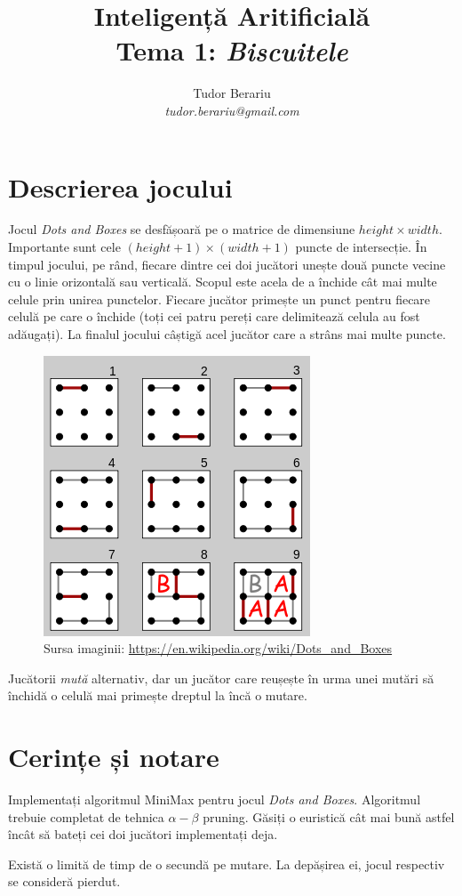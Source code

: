 \documentclass[12pt]{article}
\title{Inteligență Aritificială \\ Tema 1: \emph{Biscuitele}}
\author{Tudor Berariu \\ \emph{tudor.berariu@gmail.com}}
\begin{document}
\maketitle

\section{Descrierea jocului}
\label{sec:desc}

Jocul \emph{Dots and Boxes} se desfășoară pe o matrice de dimensiune
$height \times width$. Importante sunt cele $(height+1) \times
(width+1)$ puncte de intersecție. În timpul jocului, pe rând, fiecare
dintre cei doi jucători unește două puncte vecine cu o linie
orizontală sau verticală. Scopul este acela de a închide cât mai multe
celule prin unirea punctelor. Fiecare jucător primește un punct pentru
fiecare celulă pe care o închide (toți cei patru pereți care
delimitează celula au fost adăugați). La finalul jocului câștigă acel
jucător care a strâns mai multe puncte.

\begin{figure}[h]
  \centering
  \includegraphics[width=.3\textwidth]{dots.png}
  \caption{Sursa imaginii: \url{https://en.wikipedia.org/wiki/Dots_and_Boxes}}
\end{figure}

Jucătorii \emph{mută} alternativ, dar un jucător care reușește în urma
unei mutări să închidă o celulă mai primește dreptul la încă o mutare.

\section{Cerințe și notare}
\label{sec:tasks}

Implementați algoritmul MiniMax pentru jocul \emph{Dots and
  Boxes}. Algoritmul trebuie completat de tehnica $\alpha-\beta$
pruning. Găsiți o euristică cât mai bună astfel încât să bateți cei
doi jucători implementați deja.

Există o limită de timp de o secundă pe mutare. La depășirea ei, jocul
respectiv se consideră pierdut.
\end{document}

